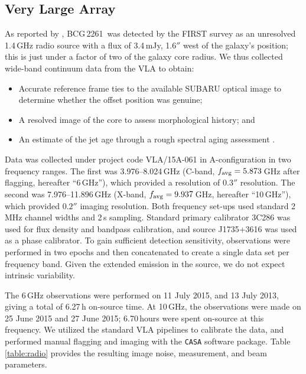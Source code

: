 \documentclass[useAMS,usenatbib]{emulateapj}
\newcommand{\src}{BCG\,2261}
\newcommand{\eg}{e.\,g.}
\begin{document}
\subsection{Very Large Array}\label{sec:VLAdata}
As reported by \citet{postman12}, \src\ was detected by the FIRST survey \citep{FIRST} as an unresolved 1.4\,GHz radio source with a flux of 3.4\,mJy, 1.6$''$ west of the galaxy's position; this is just under a factor of two of the galaxy core radius. 
We thus collected wide-band continuum data from the VLA to obtain:
\begin{itemize}
\item Accurate reference frame ties to the available \mbox{SUBARU} optical image to determine whether the offset position was genuine;
\item A resolved image of the core to assess morphological history; and
\item An estimate of the jet age through a rough spectral aging assessment \citep[\eg][]{carilli+91}.
\end{itemize}

Data was collected under project code VLA/15A-061 in A-configuration in two frequency ranges. The first was 3.976--8.024\,GHz (C-band, $f_{\rm avg}=5.873$\,GHz after flagging, hereafter ``6\,GHz''), which provided a resolution of $0.3''$ resolution. The second was 7.976--11.896\,GHz (X-band, $f_{\rm avg}=9.937$\,GHz, hereafter ``10\,GHz''), which provided $0.2''$ imaging resolution. 
Both frequency set-ups used standard 2\,MHz channel widths and 2\,s sampling. Standard primary calibrator 3C286 was used for flux density and bandpass calibration, and source J1735+3616 was used as a phase calibrator. To gain sufficient detection sensitivity, observations were performed in two epochs and then concatenated to create a single data set per frequency band. Given the extended emission in the source, we do not expect intrinsic variability.

The 6\,GHz observations were performed on 11 July 2015, and 13 July 2013, giving a total of 6.27\,h on-source time.
At 10\,GHz, the observations were made on 25 June 2015 and 27 June 2015; 6.70\,hours were spent on-source at this frequency. We utilized the standard VLA pipelines to calibrate the data, and performed manual flagging and imaging with the {\tt CASA} software package. Table\,\ref{table:radio} provides the resulting image noise, measurement, and beam parameters.
\end{document}
